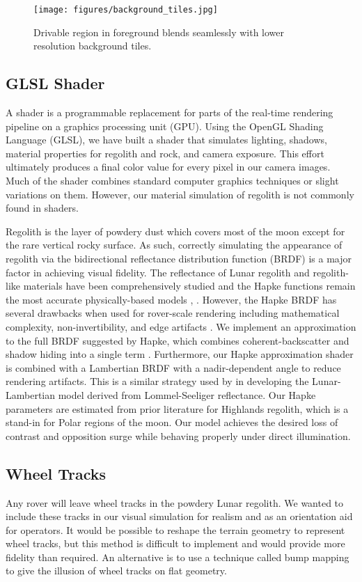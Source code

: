 \documentclass[twocolumn,letterpaper]{IEEEAerospaceCLS}  %
\begin{document}
\begin{figure}[h!]
  \texttt{[image: figures/background\_tiles.jpg]}
  \caption{Drivable region in foreground blends seamlessly with lower resolution background tiles.}
  \label{fig:background_tiles}
\end{figure}

\subsection{GLSL Shader}

A shader is a programmable replacement for parts of the real-time rendering pipeline on a graphics processing unit (GPU). 
Using the OpenGL Shading Language (GLSL), we have built a shader that simulates lighting, shadows, material properties for regolith and rock, and camera exposure. 
This effort ultimately produces a final color value for every pixel in our camera images. 
Much of the shader combines standard computer graphics techniques or slight variations on them. 
However, our material simulation of regolith is not commonly found in shaders.

Regolith is the layer of powdery dust which covers most of the moon except for the rare vertical rocky surface. 
As such, correctly simulating the appearance of regolith via the bidirectional reflectance distribution function (BRDF) is a major factor in achieving visual fidelity. 
The reflectance of Lunar regolith and regolith-like materials have been comprehensively studied and the Hapke functions remain the most accurate physically-based models \cite{Shepard2007}, \cite{hapke2012}. 
However, the Hapke BRDF has several drawbacks when used for rover-scale rendering including mathematical complexity, non-invertibility, and edge artifacts \cite{Wong2012}. We implement an approximation to the full BRDF suggested by Hapke, which combines coherent-backscatter and shadow hiding into a single term \cite{hapke2012}. 
Furthermore, our Hapke approximation shader is combined with a Lambertian BRDF with a nadir-dependent angle to reduce rendering artifacts. 
This is a similar strategy used by \cite{McEwen1996} in developing the Lunar-Lambertian model derived from Lommel-Seeliger reflectance. 
Our Hapke parameters are estimated from prior literature for Highlands regolith, which is a stand-in for Polar regions of the moon. 
Our model achieves the desired loss of contrast and opposition surge while behaving properly under direct illumination.           

\subsection{Wheel Tracks}
Any rover will leave wheel tracks in the powdery Lunar regolith. We wanted to include these tracks in our visual simulation for realism and as an orientation aid for operators. 
It would be possible to reshape the terrain geometry to represent wheel tracks, but this method is difficult to implement and would provide more fidelity than required.
An alternative is to use a technique called bump mapping to give the illusion of wheel tracks on flat geometry.
\end{document}
